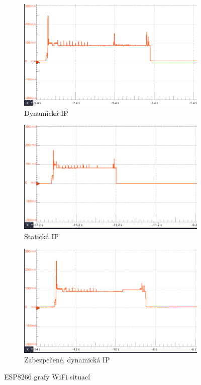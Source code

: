 \documentclass[a4paper, 12pt]{report}
\begin{document}
    \begin{figure}[h!]
        \centering
        \begin{subfigure}[b]{0.65\linewidth}
            \includegraphics[width=\linewidth]{images/ESP8266_network_dynamic_specific}
            \caption{Dynamická IP}
        \end{subfigure}
        \begin{subfigure}[b]{0.65\linewidth}
            \includegraphics[width=\linewidth]{images/ESP8266_network_static}
            \caption{Statická IP}
        \end{subfigure}
        \begin{subfigure}[b]{0.65\linewidth}
            \includegraphics[width=\linewidth]{images/ESP8266_network_static_security}
            \caption{Zabezpečené, dynamická IP}
        \end{subfigure}
        \caption{ESP8266 grafy WiFi situací}
        \label{fig:esp8266_network}
    \end{figure}
    \newpage
\end{document}
